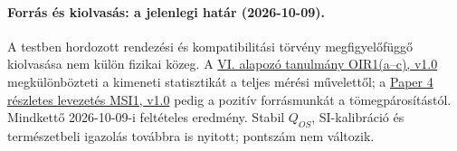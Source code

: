\documentclass[12pt]{article}
\begin{document}
\paragraph{Forrás és kiolvasás: a jelenlegi határ (2026-10-09).}
A testben hordozott rendezési és kompatibilitási törvény megfigyelőfüggő kiolvasása nem külön fizikai közeg. A \href{https://github.com/tau-core-research/tau-core-quantum-readout-foundation-paper-vi/blob/main/paperVI_submission_source/main.pdf#nameddest=oir1}{VI. alapozó tanulmány OIR1(a--c), v1.0} megkülönbözteti a kimeneti statisztikát a teljes mérési művelettől; a \href{https://github.com/tau-core-research/tau-core-higgs-module-paper4/blob/main/paper4_full_derivation/full_derivation.pdf#nameddest=msi1}{Paper 4 részletes levezetés MSI1, v1.0} pedig a pozitív forrásmunkát a tömegpárosítástól. Mindkettő 2026-10-09-i feltételes eredmény. Stabil $Q_{OS}$, SI-kalibráció és természetbeli igazolás továbbra is nyitott; pontszám nem változik.
\end{document}

